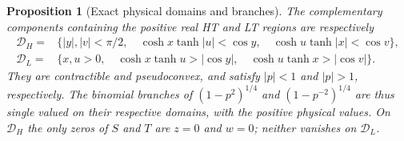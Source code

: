 \documentclass[11pt]{article}
\numberwithin{equation}{section}
\newtheorem{proposition}[theorem]{Proposition}
\theoremstyle{definition}
\begin{document}
\begin{proposition}[Exact physical domains and branches]
\label{geo:new:domains}
The complementary components containing the positive real HT and
LT regions are respectively
\begin{align*}
 \mathcal D_H={}&\{|y|,|v|<\pi/2,\quad
   \cosh x\tanh|u|<\cos y,\quad
   \cosh u\tanh|x|<\cos v\},\\
 \mathcal D_L={}&\{x,u>0,\quad
   \cosh x\tanh u>|\cos y|,\quad
   \cosh u\tanh x>|\cos v|\}.
\end{align*}
They are contractible and pseudoconvex, and satisfy $|p|<1$
and $|p|>1$, respectively.  The binomial branches of
$(1-p^2)^{1/4}$ and $(1-p^{-2})^{1/4}$ are thus single valued
on their respective domains, with the positive physical values.
On $\mathcal D_H$ the only zeros of $S$ and $T$ are $z=0$
and $w=0$; neither vanishes on $\mathcal D_L$.
\end{proposition}
\end{document}
